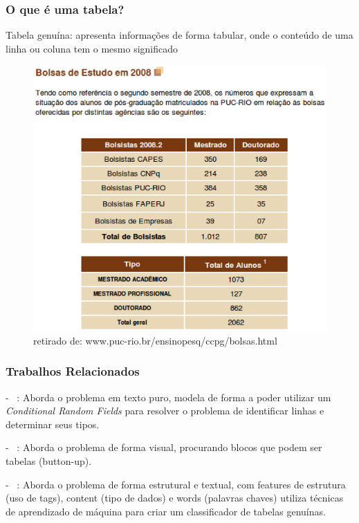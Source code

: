 \documentclass{beamer}
\newenvironment{my_itemize}{
\begin{itemize}
  \setlength{\itemsep}{5pt}
  \setlength{\parskip}{2pt}
  \setlength{\parsep}{3pt}
}{\end{itemize}}
\begin{document}
\begin{frame}
\frametitle{O que é uma tabela?}
    \begin{my_itemize}
      \item Tabela genuína: apresenta informações de forma tabular, onde o conteúdo de uma linha ou coluna tem o mesmo significado
    \end{my_itemize}

\begin{figure}[h]
  \center
  \includegraphics[scale=0.25]{img/table}
  \caption{retirado de: www.puc-rio.br/ensinopesq/ccpg/bolsas.html}
\end{figure}

\end{frame}


\begin{frame}
\frametitle{Trabalhos Relacionados}

  \begin{my_itemize}
    \item[-] ~\cite{Pinto2003}: Aborda o problema em texto puro, modela
    de forma a poder utilizar um {\it Conditional Random Fields} para resolver o problema de identificar linhas e determinar seus tipos.

\pause
   \item[-] ~\cite{Krupl2006}: Aborda o problema de forma visual, procurando blocos que podem ser tabelas (button-up).

\pause
   \item[-] ~\cite{Wang2002}: Aborda o problema de forma estrutural e textual, com features de estrutura (uso de tags), content (tipo de dados) e words (palavras chaves) utiliza técnicas de aprendizado de máquina para criar um classificador de tabelas genuínas.

  \end{my_itemize}

\end{frame}
\end{document}
